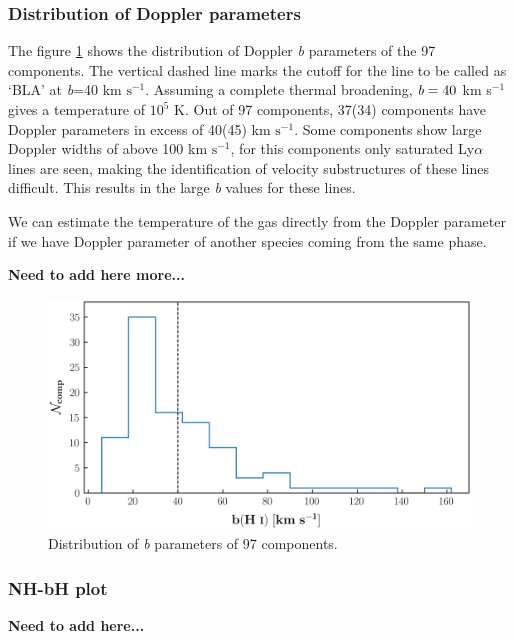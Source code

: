 \subsubsection*{Distribution of Doppler parameters}

The figure \ref{fig:b_HI_distribution} shows the distribution of Doppler \emph{b} parameters of the 97  components. The vertical dashed line marks the cutoff for the line to be called as `BLA' at \emph{b}=40 km $\text{s}^{-1}$. Assuming a complete thermal broadening, $\emph{b}=40$ km s$^{-1}$ gives a temperature of $10^5$ K. Out of 97 components, 37(34) components have Doppler parameters in excess of 40(45) km $\text{s}^{-1}$. Some components show large Doppler widths of above 100 km $\text{s}^{-1}$, for this components only saturated Ly$\alpha$ lines are seen, making the identification of velocity substructures of these lines difficult. This results in the large \emph{b} values for these lines. 

We can estimate the temperature of the gas directly from the Doppler parameter if we have Doppler parameter of another species coming from the same phase. 

\textbf{Need to add here more...}

\begin{figure}
    \centering
    \includegraphics[width=\linewidth]{Figures/b_HI_distribution_survey.png}
    \caption{Distribution of \emph{b} parameters of 97  components.}
    \label{fig:b_HI_distribution} 
\end{figure}

\subsubsection*{NH-bH plot} 

\textbf{Need to add here...}


